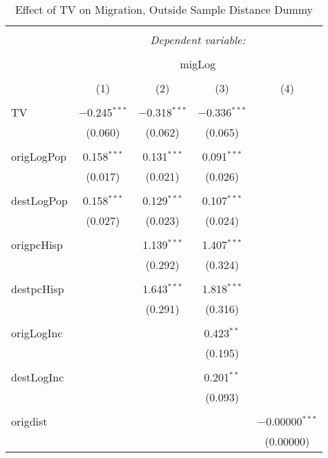 
\begin{table}[!htbp] \centering 
  \caption{Effect of TV on Migration, Outside Sample Distance Dummy} 
  \label{} 
\begin{tabular}{@{\extracolsep{5pt}}lcccc} 
\\[-1.8ex]\hline 
\hline \\[-1.8ex] 
 & \multicolumn{4}{c}{\textit{Dependent variable:}} \\ 
\cline{2-5} 
\\[-1.8ex] & \multicolumn{4}{c}{migLog} \\ 
\\[-1.8ex] & (1) & (2) & (3) & (4)\\ 
\hline \\[-1.8ex] 
 TV & $-$0.245$^{***}$ & $-$0.318$^{***}$ & $-$0.336$^{***}$ &  \\ 
  & (0.060) & (0.062) & (0.065) &  \\ 
  & & & & \\ 
 origLogPop & 0.158$^{***}$ & 0.131$^{***}$ & 0.091$^{***}$ &  \\ 
  & (0.017) & (0.021) & (0.026) &  \\ 
  & & & & \\ 
 destLogPop & 0.158$^{***}$ & 0.129$^{***}$ & 0.107$^{***}$ &  \\ 
  & (0.027) & (0.023) & (0.024) &  \\ 
  & & & & \\ 
 origpcHisp &  & 1.139$^{***}$ & 1.407$^{***}$ &  \\ 
  &  & (0.292) & (0.324) &  \\ 
  & & & & \\ 
 destpcHisp &  & 1.643$^{***}$ & 1.818$^{***}$ &  \\ 
  &  & (0.291) & (0.316) &  \\ 
  & & & & \\ 
 origLogInc &  &  & 0.423$^{**}$ &  \\ 
  &  &  & (0.195) &  \\ 
  & & & & \\ 
 destLogInc &  &  & 0.201$^{**}$ &  \\ 
  &  &  & (0.093) &  \\ 
  & & & & \\ 
 origdist &  &  &  & $-$0.00000$^{***}$ \\ 
  &  &  &  & (0.00000) \\ 

\end{tabular}
\end{table}
